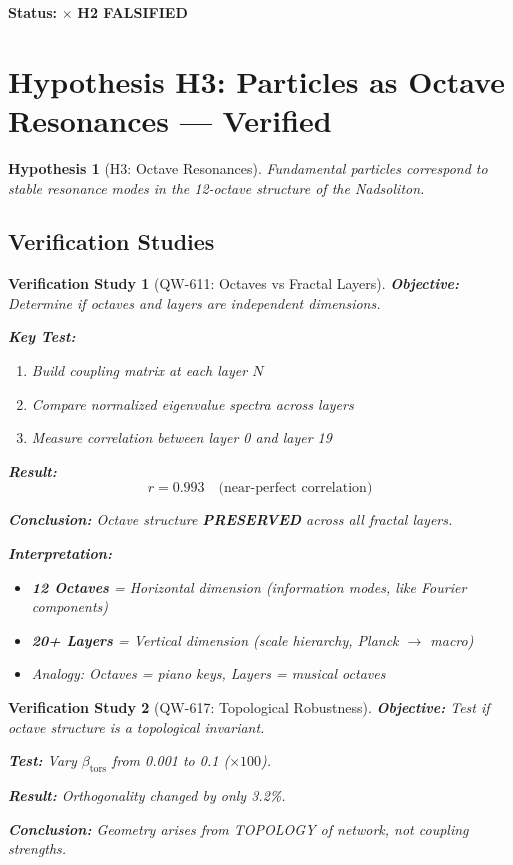 \documentclass[11pt, a4paper]{article}
\newtheorem{hypothesis}{Hypothesis}[section]
\newtheorem{verification}{Verification Study}[section]
\theoremstyle{remark}
\newcommand{\betators}{\beta_{\text{tors}}}
\begin{document}
\textbf{Status:} $\times$ \textbf{H2 FALSIFIED}

\section{Hypothesis H3: Particles as Octave Resonances --- Verified}

\begin{hypothesis}[H3: Octave Resonances]
Fundamental particles correspond to stable resonance modes in the 12-octave structure of the Nadsoliton.
\end{hypothesis}

\subsection{Verification Studies}

\begin{verification}[QW-611: Octaves vs Fractal Layers]
\textbf{Objective:} Determine if octaves and layers are independent dimensions.

\textbf{Key Test:}
\begin{enumerate}
    \item Build coupling matrix at each layer $N$
    \item Compare normalized eigenvalue spectra across layers
    \item Measure correlation between layer 0 and layer 19
\end{enumerate}

\textbf{Result:}
\begin{equation}
r = 0.993 \quad \text{(near-perfect correlation)}
\end{equation}

\textbf{Conclusion:} Octave structure \textbf{PRESERVED} across all fractal layers.

\textbf{Interpretation:}
\begin{itemize}
    \item \textbf{12 Octaves} = Horizontal dimension (information modes, like Fourier components)
    \item \textbf{20+ Layers} = Vertical dimension (scale hierarchy, Planck $\to$ macro)
    \item Analogy: Octaves = piano keys, Layers = musical octaves
\end{itemize}
\end{verification}

\begin{verification}[QW-617: Topological Robustness]
\textbf{Objective:} Test if octave structure is a topological invariant.

\textbf{Test:} Vary $\betators$ from 0.001 to 0.1 ($\times 100$).

\textbf{Result:} Orthogonality changed by only 3.2\%.

\textbf{Conclusion:} Geometry arises from TOPOLOGY of network, not coupling strengths.
\end{verification}
\end{document}
